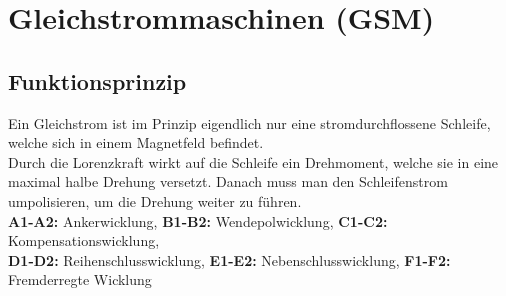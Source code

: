 \section{Gleichstrommaschinen (GSM)}
    \subsection{Funktionsprinzip}
    Ein Gleichstrom ist im Prinzip eigendlich nur eine stromdurchflossene Schleife, welche sich in einem Magnetfeld
    befindet. \\
    Durch die Lorenzkraft wirkt auf die Schleife ein Drehmoment, welche sie in eine maximal halbe Drehung versetzt.
    Danach muss man den Schleifenstrom umpolisieren, um die Drehung weiter zu führen. \\
    \textbf{A1-A2:} Ankerwicklung, \textbf{B1-B2:} Wendepolwicklung, \textbf{C1-C2:} Kompensationswicklung, \\
    \textbf{D1-D2:} Reihenschlusswicklung, \textbf{E1-E2:} Nebenschlusswicklung, \textbf{F1-F2:} Fremderregte Wicklung \\
    \begin{minipage}{10cm}
    \end{minipage}
    \begin{minipage}{7cm}
    \end{minipage}
    
